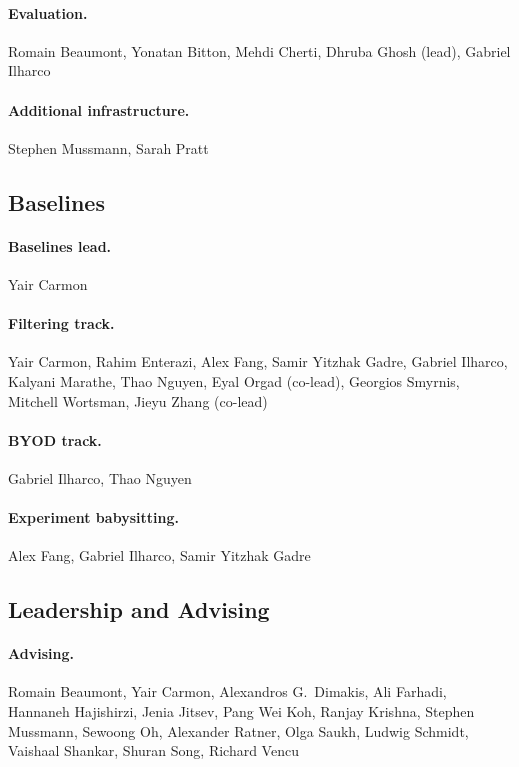 \paragraph{Evaluation.} Romain Beaumont, Yonatan Bitton, Mehdi Cherti, Dhruba Ghosh (lead), Gabriel Ilharco

\paragraph{Additional infrastructure.} Stephen Mussmann, Sarah Pratt

\subsection{Baselines}

\paragraph{Baselines lead.} Yair Carmon

\paragraph{Filtering track.} Yair Carmon, Rahim Enterazi, Alex Fang, Samir Yitzhak Gadre, Gabriel Ilharco, Kalyani Marathe, Thao Nguyen, Eyal Orgad (co-lead), Georgios Smyrnis, Mitchell Wortsman, Jieyu Zhang (co-lead)

\paragraph{BYOD track.} Gabriel Ilharco, Thao Nguyen

\paragraph{Experiment babysitting.} Alex Fang, Gabriel Ilharco, Samir Yitzhak Gadre

\subsection{Leadership and Advising}

\paragraph{Advising.} Romain Beaumont, Yair Carmon, Alexandros G.\ Dimakis, Ali Farhadi, Hannaneh Hajishirzi, Jenia Jitsev, Pang Wei Koh, Ranjay Krishna, Stephen Mussmann, Sewoong Oh, Alexander Ratner, Olga Saukh, Ludwig Schmidt, Vaishaal Shankar, Shuran Song, Richard Vencu


